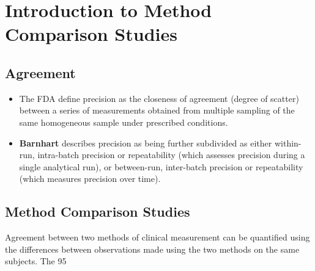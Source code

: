 \documentclass{report}
\begin{document}
\tableofcontents
\newpage
\chapter{Introduction to Method Comparison Studies}



\newpage
\section{Agreement}
\begin{itemize}
\item The FDA define precision as the closeness of agreement (degree of
 scatter) between a series of measurements obtained from multiple
 sampling of the same homogeneous sample under prescribed
 conditions. 
\item \textbf{Barnhart} describes precision as being further
 subdivided as either within-run, intra-batch precision or
 repeatability (which assesses precision during a single analytical
 run), or between-run, inter-batch precision or repeatability
(which measures precision over time).
\end{itemize}

\section{Method Comparison Studies}

Agreement between two methods of clinical measurement can be quantified using the differences between observations made using the two methods on the same subjects. The 95%
\end{document}
